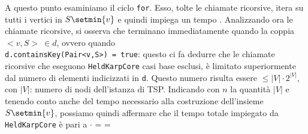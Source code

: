 A questo punto esaminiamo il ciclo \texttt{for}. Esso, tolte le chiamate ricorsive, itera su tutti i vertici in $S\setmin \{v\}$ e quindi impiega un tempo . Analizzando ora le chiamate ricorsive, si osserva che terminano immediatamente quando la coppia $<\!\!v, S\!\!>\ \in d$, ovvero quando\\ \texttt{d.containsKey(Pair<v,S>) = true}: questo ci fa dedurre che le chiamate ricorsive che eseguono \texttt{HeldKarpCore} casi base esclusi, è limitato superiormente dal numero di elementi indicizzati in \texttt{d}. Questo numero risulta essere $\leq |V|\cdot 2^{|V|}$, con $|V|$: numero di nodi dell'istanza di TSP.\eqcapo
Indicando con $n$ la quantità $|V|$ e tenendo conto anche del tempo necessario alla costruzione dell'insieme $S\setmin \{v\}$, possiamo quindi affermare che il tempo totale impiegato da \texttt{HeldKarpCore} è pari a 
$\cdot$ =  = 


